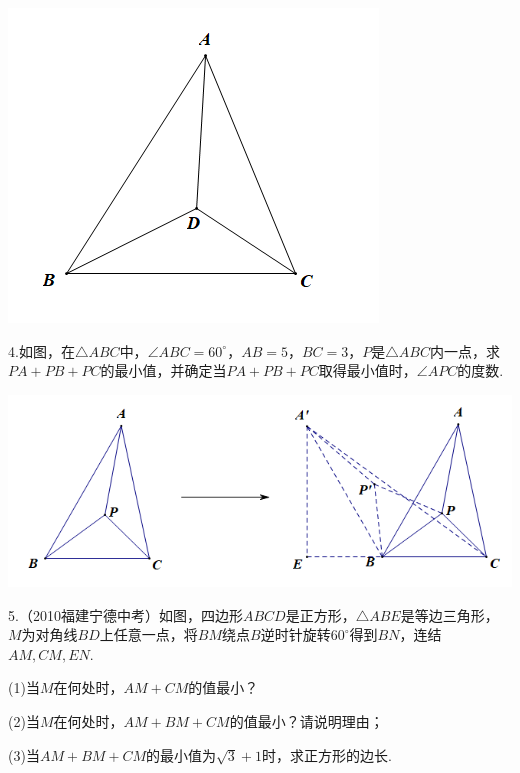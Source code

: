 \documentclass[10pt]{ctexart}
\begin{document}
\begin{center}
	\includegraphics[scale=0.5]{figure/feimadian25}
\end{center}

\begin{shaded}
4.如图，在$\triangle ABC$中，$\angle ABC=60^\circ$，$AB=5$，$BC=3$，$P$是$\triangle ABC$内一点，求$PA+PB+PC$的最小值，并确定当$PA+PB+PC$取得最小值时，$\angle APC$的度数.
\end{shaded}

\begin{center}
	\includegraphics[scale=0.6]{figure/feimadian10}
\end{center}

\begin{shaded}
5.（2010福建宁德中考）如图，四边形$ABCD$是正方形，$\triangle ABE$是等边三角形，$M$为对角线$BD$上任意一点，将$BM$绕点$B$逆时针旋转$60^\circ$得到$BN$，连结$AM,CM,EN$.

(1)当$M$在何处时，$AM+CM$的值最小？

(2)当$M$在何处时，$AM+BM+CM$的值最小？请说明理由；

(3)当$AM+BM+CM$的最小值为$\sqrt{3}+1$时，求正方形的边长.
\end{shaded}
\end{document}
